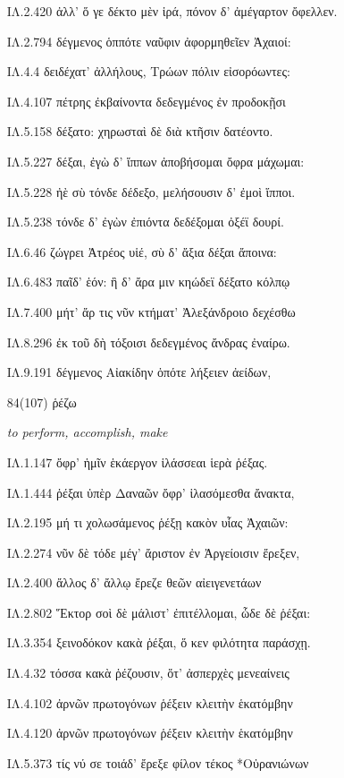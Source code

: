 \begin{enumerate}
{ΙΛ.2.420 ἀλλ' ὅ γε δέκτο μὲν ἱρά, πόνον δ' ἀμέγαρτον ὄφελλεν. 

ΙΛ.2.794 δέγμενος ὁππότε ναῦφιν ἀφορμηθεῖεν Ἀχαιοί: 

ΙΛ.4.4 δειδέχατ' ἀλλήλους, Τρώων πόλιν εἰσορόωντες: 

ΙΛ.4.107 πέτρης ἐκβαίνοντα δεδεγμένος ἐν προδοκῇσι 

ΙΛ.5.158 δέξατο: χηρωσταὶ δὲ διὰ κτῆσιν δατέοντο. 

ΙΛ.5.227 δέξαι, ἐγὼ δ' ἵππων ἀποβήσομαι ὄφρα μάχωμαι: 

ΙΛ.5.228 ἠὲ σὺ τόνδε δέδεξο, μελήσουσιν δ' ἐμοὶ ἵπποι. 

ΙΛ.5.238 τόνδε δ' ἐγὼν ἐπιόντα δεδέξομαι ὀξέϊ δουρί. 

ΙΛ.6.46 ζώγρει Ἀτρέος υἱέ, σὺ δ' ἄξια δέξαι ἄποινα: 

ΙΛ.6.483 παῖδ' ἑόν: ἣ δ' ἄρα μιν κηώδεϊ δέξατο κόλπῳ 

ΙΛ.7.400 μήτ' ἄρ τις νῦν κτήματ' Ἀλεξάνδροιο δεχέσθω 

ΙΛ.8.296 ἐκ τοῦ δὴ τόξοισι δεδεγμένος ἄνδρας ἐναίρω. 

ΙΛ.9.191 δέγμενος Αἰακίδην ὁπότε λήξειεν ἀείδων, 

}

\clearpage
\item[\large 84(107)]{\large \g ῥέζω}

\hspace{0.2cm} \textit{ to perform, accomplish, make }

{\g
ΙΛ.1.147 ὄφρ' ἡμῖν ἑκάεργον ἱλάσσεαι ἱερὰ ῥέξας. 

ΙΛ.1.444 ῥέξαι ὑπὲρ Δαναῶν ὄφρ' ἱλασόμεσθα ἄνακτα, 

ΙΛ.2.195 μή τι χολωσάμενος ῥέξῃ κακὸν υἷας Ἀχαιῶν: 

ΙΛ.2.274 νῦν δὲ τόδε μέγ' ἄριστον ἐν Ἀργείοισιν ἔρεξεν, 

ΙΛ.2.400 ἄλλος δ' ἄλλῳ ἔρεζε θεῶν αἰειγενετάων 

ΙΛ.2.802 Ἕκτορ σοὶ δὲ μάλιστ' ἐπιτέλλομαι, ὧδε δὲ ῥέξαι: 

ΙΛ.3.354 ξεινοδόκον κακὰ ῥέξαι, ὅ κεν φιλότητα παράσχῃ. 

ΙΛ.4.32 τόσσα κακὰ ῥέζουσιν, ὅτ' ἀσπερχὲς μενεαίνεις 

ΙΛ.4.102 ἀρνῶν πρωτογόνων ῥέξειν κλειτὴν ἑκατόμβην 

ΙΛ.4.120 ἀρνῶν πρωτογόνων ῥέξειν κλειτὴν ἑκατόμβην 

ΙΛ.5.373 τίς νύ σε τοιάδ' ἔρεξε φίλον τέκος *Οὐρανιώνων 

}
\end{enumerate}
